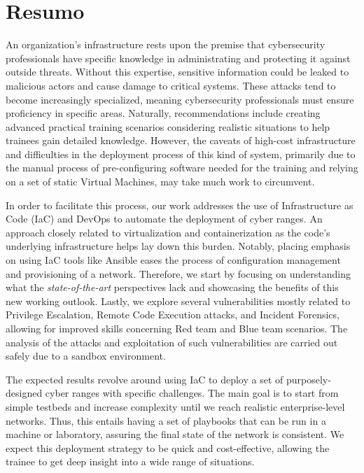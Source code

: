 \chapter*{Resumo}

An organization's infrastructure rests upon the premise that cybersecurity professionals have specific knowledge in administrating and protecting it against outside threats. Without this expertise, sensitive information could be leaked to malicious actors and cause damage to critical systems. These attacks tend to become increasingly specialized, meaning cybersecurity professionals must ensure proficiency in specific areas. Naturally, recommendations include creating advanced practical training scenarios considering realistic situations to help trainees gain detailed knowledge. However, the caveats of high-cost infrastructure and difficulties in the deployment process of this kind of system, primarily due to the manual process of pre-configuring software needed for the training and relying on a set of static Virtual Machines, may take much work to circumvent.

In order to facilitate this process, our work addresses the use of Infrastructure as Code (IaC) and DevOps to automate the deployment of cyber ranges. An approach closely related to virtualization and containerization as the code's underlying infrastructure helps lay down this burden. Notably, placing emphasis on using IaC tools like Ansible eases the process of configuration management and provisioning of a network. Therefore, we start by focusing on understanding what the \textit{state-of-the-art} perspectives lack and showcasing the benefits of this new working outlook. Lastly, we explore several vulnerabilities mostly related to Privilege Escalation, Remote Code Execution attacks, and Incident Forensics, allowing for improved skills concerning Red team and Blue team scenarios. The analysis of the attacks and exploitation of such vulnerabilities are carried out safely due to a sandbox environment.

The expected results revolve around using IaC to deploy a set of purposely-designed cyber ranges with specific challenges. The main goal is to start from simple testbeds and increase complexity until we reach realistic enterprise-level networks. Thus, this entails having a set of playbooks that can be run in a machine or laboratory, assuring the final state of the network is consistent. We expect this deployment strategy to be quick and cost-effective, allowing the trainee to get deep insight into a wide range of situations.

